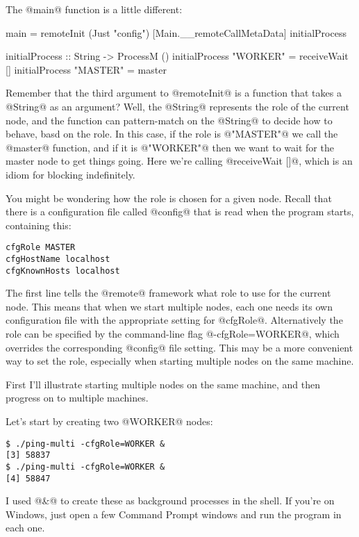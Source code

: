 The @main@ function is a little different:

\begin{numhaskell}
main = remoteInit (Just "config") [Main.__remoteCallMetaData] initialProcess

initialProcess :: String -> ProcessM ()
initialProcess "WORKER" = receiveWait []
initialProcess "MASTER" = master
\end{numhaskell}

Remember that the third argument to @remoteInit@ is a function that
takes a @String@ as an argument?  Well, the @String@ represents the
role of the current node, and the function can pattern-match on the
@String@ to decide how to behave, basd on the role.  In this case, if
the role is @"MASTER"@ we call the @master@ function, and if it is
@"WORKER"@ then we want to wait for the master node to get things
going.  Here we're calling @receiveWait []@, which is an idiom for
blocking indefinitely.

You might be wondering how the role is chosen for a given node.
Recall that there is a configuration file called @config@ that is read
when the program starts, containing this:

\begin{verbatim}
cfgRole MASTER
cfgHostName localhost
cfgKnownHosts localhost
\end{verbatim}

The first line tells the @remote@ framework what role to use for the
current node.  This means that when we start multiple nodes, each one
needs its own configuration file with the appropriate setting for
@cfgRole@.  Alternatively the role can be specified by the
command-line flag @-cfgRole=WORKER@, which overrides the corresponding
@config@ file setting.  This may be a more convenient way to set the
role, especially when starting multiple nodes on the same machine.


First I'll illustrate starting multiple nodes on the same machine, and
then progress on to multiple machines.

Let's start by creating two @WORKER@ nodes:

\begin{verbatim}
$ ./ping-multi -cfgRole=WORKER &
[3] 58837
$ ./ping-multi -cfgRole=WORKER &
[4] 58847
\end{verbatim}

I used @&@ to create these as background processes in the shell.  If
you're on Windows, just open a few Command Prompt windows and run the
program in each one.

